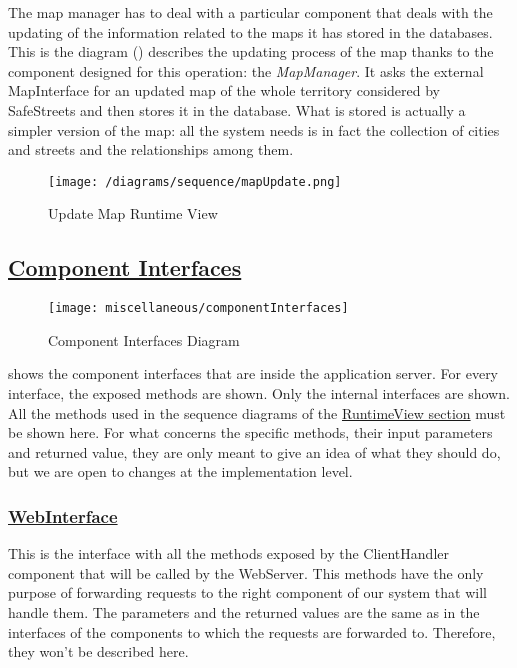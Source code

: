 		The map manager has to deal with a particular component that deals with the updating of the information related to the maps it has stored in the databases. This is the diagram () describes the updating process of the map thanks to the component designed for this operation: the \emph{MapManager}. It asks the external MapInterface for an updated map of the whole territory considered by SafeStreets and then stores it in the database. What is stored is actually a simpler version of the map: all the system needs is in fact the collection of cities and streets and the relationships among them.
		
		\begin{figure}[h!]
			\centering
			\texttt{[image: /diagrams/sequence/mapUpdate.png]}
			\caption{\label{fig:mapUpdateRuntime} Update Map Runtime View}
		\end{figure}		
	
	\subsection[Component Interfaces]{\hyperlink{toc}{Component Interfaces}}
		\label{sec:componentInterfaces}
		
		\begin{figure}[hbtp]
			\centering
			\texttt{[image: miscellaneous/componentInterfaces]}
			\caption{\label{fig:componentInterfaces} Component Interfaces Diagram}
		\end{figure}
		
		 shows the component interfaces that are inside the application server. For every interface, the exposed methods are shown. Only the internal interfaces are shown. All the methods used in the sequence diagrams of the \hyperref[sec:runtimeView]{RuntimeView section} must be shown here. For what concerns the specific methods, their input parameters and returned value, they are only meant to give an idea of what they should do, but we are open to changes at the implementation level.
		
		\subsubsection[WebInterface]{\hyperlink{toc}{WebInterface}}
			This is the interface with all the methods exposed by the ClientHandler component that will be called by the WebServer. This methods have the only purpose of forwarding requests to the right component of our system that will handle them. The parameters and the returned values are the same as in the interfaces of the components to which the requests are forwarded to. Therefore, they won't be described here.
		
